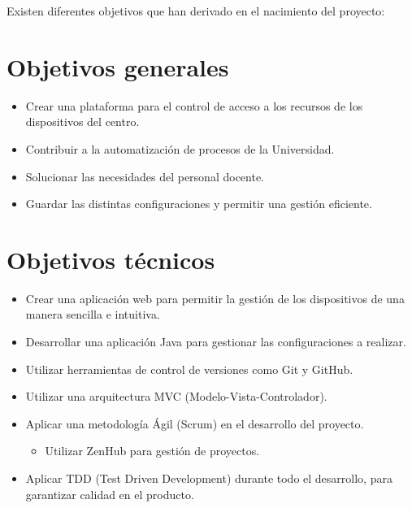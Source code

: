 
Existen diferentes objetivos que han derivado en el nacimiento del proyecto:

\section{Objetivos generales}\label{sec:objetivos-generales}
    \begin{itemize}
        \item Crear una plataforma para el control de acceso a los recursos de los dispositivos del centro.
        \item Contribuir a la automatización de procesos de la Universidad.
        \item Solucionar las necesidades del personal docente.
        \item Guardar las distintas configuraciones y permitir una gestión eficiente.
    \end{itemize}


\section{Objetivos técnicos}\label{sec:objetivos-tecnicos}
    \begin{itemize}
        \item Crear una aplicación web para permitir la gestión de los dispositivos de una manera sencilla e intuitiva.
        \item Desarrollar una aplicación Java para gestionar las configuraciones a realizar.
        \item Utilizar herramientas de control de versiones como Git y GitHub.
        \item Utilizar una arquitectura MVC (Modelo-Vista-Controlador).
        \item Aplicar una metodología Ágil (Scrum) en el desarrollo del proyecto.
            \begin{itemize}
                \item Utilizar ZenHub para gestión de proyectos.
            \end{itemize}
        \item Aplicar TDD (Test Driven Development) durante todo el desarrollo, para garantizar calidad en el producto.
    \end{itemize}


